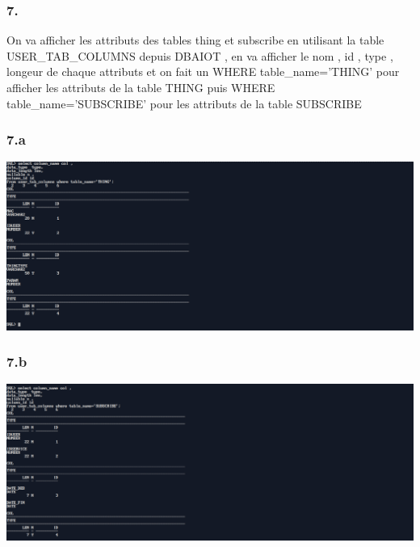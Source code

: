 \newpage
\subsubsection*{7.}
On va afficher les attributs des tables thing et subscribe en utilisant la table
USER\_TAB\_COLUMNS depuis DBAIOT , en va afficher le nom , id , type , longeur de chaque attributs
et on fait un WHERE table\_name='THING' pour afficher les attributs de la table THING puis WHERE table\_name='SUBSCRIBE' 
pour les attributs de la table SUBSCRIBE

\subsubsection*{7.a}



\begin{center}
    \includegraphics[width=\textwidth]{ScreenShot/Partie5/thing.png}
\end{center}


\subsubsection*{7.b}



\begin{center}
    \includegraphics[width=\textwidth]{ScreenShot/Partie5/sub.png}
\end{center}

